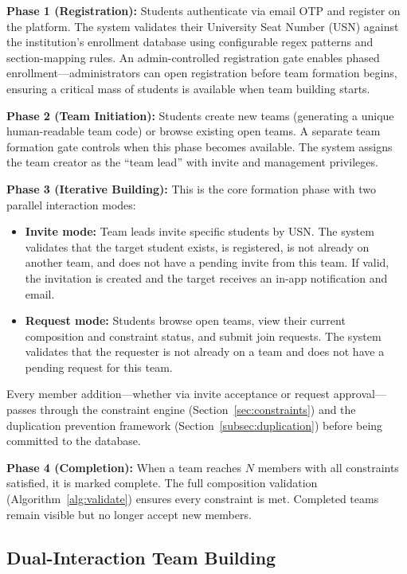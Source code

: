 \documentclass[conference]{IEEEtran}
\begin{document}
\textbf{Phase 1 (Registration):} Students authenticate via email OTP and register on the platform. The system validates their University Seat Number (USN) against the institution's enrollment database using configurable regex patterns and section-mapping rules. An admin-controlled registration gate enables phased enrollment---administrators can open registration before team formation begins, ensuring a critical mass of students is available when team building starts.

\textbf{Phase 2 (Team Initiation):} Students create new teams (generating a unique human-readable team code) or browse existing open teams. A separate team formation gate controls when this phase becomes available. The system assigns the team creator as the ``team lead'' with invite and management privileges.

\textbf{Phase 3 (Iterative Building):} This is the core formation phase with two parallel interaction modes:

\begin{itemize}[noitemsep,topsep=3pt]
    \item \textbf{Invite mode:} Team leads invite specific students by USN. The system validates that the target student exists, is registered, is not already on another team, and does not have a pending invite from this team. If valid, the invitation is created and the target receives an in-app notification and email.
    \item \textbf{Request mode:} Students browse open teams, view their current composition and constraint status, and submit join requests. The system validates that the requester is not already on a team and does not have a pending request for this team.
\end{itemize}

Every member addition---whether via invite acceptance or request approval---passes through the constraint engine (Section~\ref{sec:constraints}) and the duplication prevention framework (Section~\ref{subsec:duplication}) before being committed to the database.

\textbf{Phase 4 (Completion):} When a team reaches $N$ members with all constraints satisfied, it is marked complete. The full composition validation (Algorithm~\ref{alg:validate}) ensures every constraint is met. Completed teams remain visible but no longer accept new members.

\subsection{Dual-Interaction Team Building}
\end{document}
